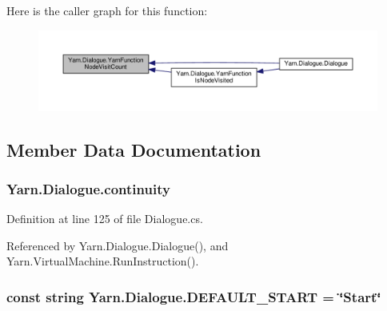 Here is the caller graph for this function\-:
\nopagebreak
\begin{figure}[H]
\begin{center}
\leavevmode
\includegraphics[width=350pt]{a00082_a10c9f22d3f55e74f091cd6069c431094_icgraph}
\end{center}
\end{figure}




\subsection{Member Data Documentation}
\hypertarget{a00082_ae94eaa4b03b432422f5d205fabe37ff5}{
\subsubsection[{continuity}]{ Yarn.\-Dialogue.\-continuity\hspace{0.3cm}{\ttfamily [package]}}}\label{a00082_ae94eaa4b03b432422f5d205fabe37ff5}


Definition at line 125 of file Dialogue.\-cs.



Referenced by Yarn.\-Dialogue.\-Dialogue(), and Yarn.\-Virtual\-Machine.\-Run\-Instruction().

\hypertarget{a00082_a1b643f15f734090e6a58cbf13dafd28f}{
\subsubsection[{D\-E\-F\-A\-U\-L\-T\-\_\-\-S\-T\-A\-R\-T}]{\setlength{\rightskip}{0pt plus 5cm}const string Yarn.\-Dialogue.\-D\-E\-F\-A\-U\-L\-T\-\_\-\-S\-T\-A\-R\-T = \char`\"{}Start\char`\"{}}}\label{a00082_a1b643f15f734090e6a58cbf13dafd28f}


